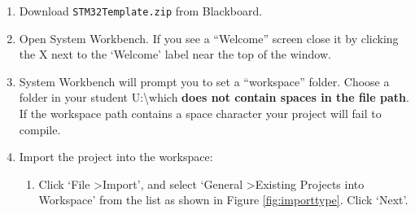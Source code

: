 \documentclass{UoNMCHA}
\numberwithin{equation}{section}
\begin{document}
\begin{enumerate}
    \item Download \texttt{STM32Template.zip} from Blackboard.
    
    \item Open System Workbench. If you see a ``Welcome'' screen close it by clicking the X next to the `Welcome' label near the top of the window.
    
    \item System Workbench will prompt you to set a ``workspace'' folder. Choose a folder in your student U:\textbackslash which \textbf{does not contain spaces in the file path}. If the workspace path contains a space character your project will fail to compile.
    
    \begin{figure}[H]
    \centering
    \end{figure}
    
    \item Import the project into the workspace:
    \begin{enumerate}
        \item Click `File \textgreater Import', and select `General \textgreater Existing Projects into Workspace' from the list as shown in Figure \ref{fig:importtype}. Click `Next'.
    

\end{enumerate}
\end{enumerate}
\end{document}
